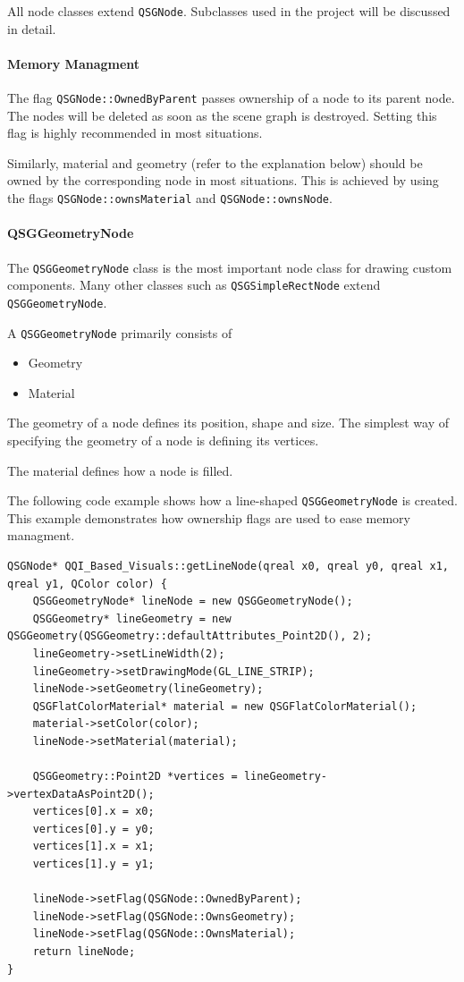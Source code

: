 All node classes extend {\tt QSGNode}.
Subclasses used in the project will be discussed in detail.

\paragraph{Memory Managment}
The flag {\tt QSGNode::OwnedByParent} passes ownership of a node to its parent node. The nodes will be deleted as soon as the scene graph is destroyed. Setting this flag is highly recommended in most situations.

Similarly, material and geometry (refer to the explanation below) should be owned by the corresponding node in most situations. This is achieved by using the flags {\tt QSGNode::ownsMaterial} and {\tt QSGNode::ownsNode}.

\paragraph{QSGGeometryNode}
The {\tt QSGGeometryNode} class is the most important node class for drawing custom components. Many other classes such as {\tt QSGSimpleRectNode} extend {\tt QSGGeometryNode}.

A {\tt QSGGeometryNode} primarily consists of 
\begin {itemize}
	\item {Geometry}
	\item {Material}
\end {itemize}

The geometry of a node defines its position, shape and size. The simplest way of specifying the geometry of a node is defining its vertices.

The material defines how a node is filled.

The following code example shows how a line-shaped {\tt QSGGeometryNode} is created.
This example demonstrates how ownership flags are used to ease memory managment.

\begin{lstlisting}
QSGNode* QQI_Based_Visuals::getLineNode(qreal x0, qreal y0, qreal x1, qreal y1, QColor color) {
    QSGGeometryNode* lineNode = new QSGGeometryNode();
    QSGGeometry* lineGeometry = new QSGGeometry(QSGGeometry::defaultAttributes_Point2D(), 2);
    lineGeometry->setLineWidth(2);
    lineGeometry->setDrawingMode(GL_LINE_STRIP);
    lineNode->setGeometry(lineGeometry);
    QSGFlatColorMaterial* material = new QSGFlatColorMaterial();
    material->setColor(color);
    lineNode->setMaterial(material);

    QSGGeometry::Point2D *vertices = lineGeometry->vertexDataAsPoint2D();
    vertices[0].x = x0;
    vertices[0].y = y0;
    vertices[1].x = x1;
    vertices[1].y = y1;

    lineNode->setFlag(QSGNode::OwnedByParent);
    lineNode->setFlag(QSGNode::OwnsGeometry);
    lineNode->setFlag(QSGNode::OwnsMaterial);
    return lineNode;
}

\end{lstlisting}


